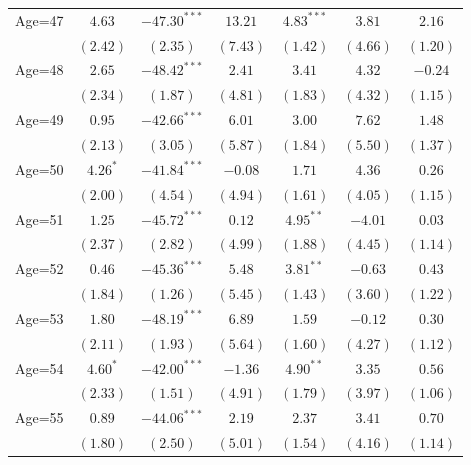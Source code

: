 \documentclass[fullpage]{paper}
\begin{document}
\begin{center}
\begin{longtable}{l c c c c c c }
Age=47      & $4.63$       & $-47.30^{***}$ & $13.21$       & $4.83^{***}$ & $3.81$        & $2.16$        \\
            & $(2.42)$     & $(2.35)$       & $(7.43)$      & $(1.42)$     & $(4.66)$      & $(1.20)$      \\
Age=48      & $2.65$       & $-48.42^{***}$ & $2.41$        & $3.41$       & $4.32$        & $-0.24$       \\
            & $(2.34)$     & $(1.87)$       & $(4.81)$      & $(1.83)$     & $(4.32)$      & $(1.15)$      \\
Age=49      & $0.95$       & $-42.66^{***}$ & $6.01$        & $3.00$       & $7.62$        & $1.48$        \\
            & $(2.13)$     & $(3.05)$       & $(5.87)$      & $(1.84)$     & $(5.50)$      & $(1.37)$      \\
Age=50      & $4.26^{*}$   & $-41.84^{***}$ & $-0.08$       & $1.71$       & $4.36$        & $0.26$        \\
            & $(2.00)$     & $(4.54)$       & $(4.94)$      & $(1.61)$     & $(4.05)$      & $(1.15)$      \\
Age=51      & $1.25$       & $-45.72^{***}$ & $0.12$        & $4.95^{**}$  & $-4.01$       & $0.03$        \\
            & $(2.37)$     & $(2.82)$       & $(4.99)$      & $(1.88)$     & $(4.45)$      & $(1.14)$      \\
Age=52      & $0.46$       & $-45.36^{***}$ & $5.48$        & $3.81^{**}$  & $-0.63$       & $0.43$        \\
            & $(1.84)$     & $(1.26)$       & $(5.45)$      & $(1.43)$     & $(3.60)$      & $(1.22)$      \\
Age=53      & $1.80$       & $-48.19^{***}$ & $6.89$        & $1.59$       & $-0.12$       & $0.30$        \\
            & $(2.11)$     & $(1.93)$       & $(5.64)$      & $(1.60)$     & $(4.27)$      & $(1.12)$      \\
Age=54      & $4.60^{*}$   & $-42.00^{***}$ & $-1.36$       & $4.90^{**}$  & $3.35$        & $0.56$        \\
            & $(2.33)$     & $(1.51)$       & $(4.91)$      & $(1.79)$     & $(3.97)$      & $(1.06)$      \\
Age=55      & $0.89$       & $-44.06^{***}$ & $2.19$        & $2.37$       & $3.41$        & $0.70$        \\
            & $(1.80)$     & $(2.50)$       & $(5.01)$      & $(1.54)$     & $(4.16)$      & $(1.14)$      \\

\end{longtable}
\end{center}
\end{document}
